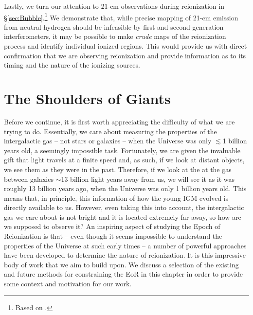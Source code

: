 Lastly, we turn our attention to 21-cm observations during reionization in \S \ref{sec:Bubble}.\footnote{Based on \citet{malloy2013identifying}.} We demonstrate that, while precise mapping of 21-cm emission from neutral hydrogen should be infeasible by first and second generation interferometers, it may be possible to make \textit{crude} maps of the reionization process and identify individual ionized regions. This would provide us with direct confirmation that we are observing reionization and provide information as to its timing and the nature of the ionizing sources.



\section{The Shoulders of Giants} \label{sec:Probes}

Before we continue, it is first worth appreciating the difficulty of what we are trying to do. Essentially, we care about measuring the properties of the intergalactic gas -- not stars or galaxies -- when the Universe was only $\lesssim$1 billion years old, a seemingly impossible task. Fortunately, we are given the invaluable gift that light travels at a finite speed and, as such, if we look at distant objects, we see them as they were in the past. Therefore, if we look at the at the gas between galaxies $\sim$13 billion light years away from us, we will see it as it was roughly 13 billion years ago, when the Universe was only 1 billion years old. This means that, in principle, this information of how the young IGM evolved is directly available to us. However, even taking this into account, the intergalactic gas we care about is not bright and it is located extremely far away, so how are we supposed to observe it? An inspiring aspect of studying the Epoch of Reionization is that -- even though it seems impossible to understand the properties of the Universe at such early times -- a number of powerful approaches have been developed to determine the nature of reionization. It is this impressive body of work that we aim to build upon. We discuss a selection of the existing and future methods for constraining the EoR in this chapter in order to provide some context and motivation for our work. 

